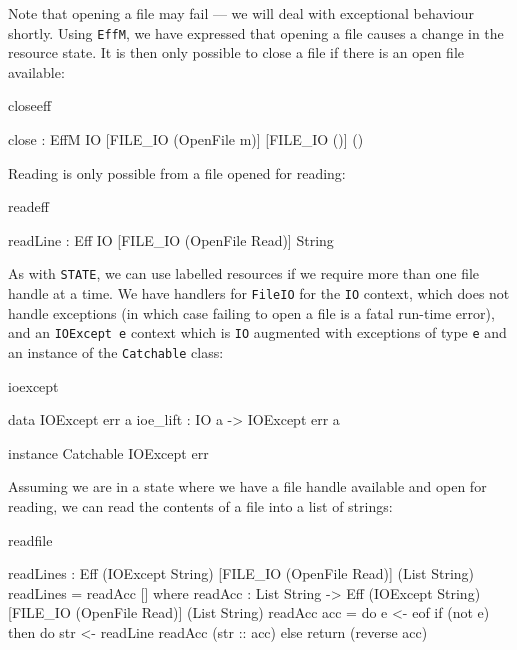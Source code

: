\noindent
Note that opening a file may fail --- we will deal with exceptional behaviour
shortly. 
Using \texttt{EffM}, we have expressed that opening a file causes a change in the
resource state.
It is then only possible to close a file if there is an open file
available:

\begin{SaveVerbatim}{closeeff}

close : EffM IO [FILE_IO (OpenFile m)] [FILE_IO ()] ()

\end{SaveVerbatim}

\noindent
Reading is only possible from a file opened for reading:

\begin{SaveVerbatim}{readeff}

readLine : Eff IO [FILE_IO (OpenFile Read)] String

\end{SaveVerbatim}

\noindent
As with \texttt{STATE}, we can use labelled resources if we require more than
one file handle at a time. We have handlers for \texttt{FileIO} for the
\texttt{IO} context, which does not handle exceptions (in which case failing
to open a file is a fatal run-time error), and an \texttt{IOExcept e}
context which is \texttt{IO} augmented with exceptions of type \texttt{e}
and an instance of the \texttt{Catchable} class:

\begin{SaveVerbatim}{ioexcept}

data IOExcept err a
ioe_lift : IO a -> IOExcept err a

instance Catchable IOExcept err

\end{SaveVerbatim}

\noindent
Assuming we are in a state where we have a file handle available and open
for reading, we can read the contents of a file into a list of strings:

\noindent
\begin{SaveVerbatim}{readfile}

 readLines : Eff (IOExcept String) 
                [FILE_IO (OpenFile Read)] (List String)
 readLines = readAcc [] where
   readAcc : List String -> 
             Eff (IOExcept String) 
                 [FILE_IO (OpenFile Read)] (List String)
   readAcc acc = do e <- eof
                    if (not e)
                       then do str <- readLine
                               readAcc (str :: acc)
                       else return (reverse acc)

\end{SaveVerbatim}

